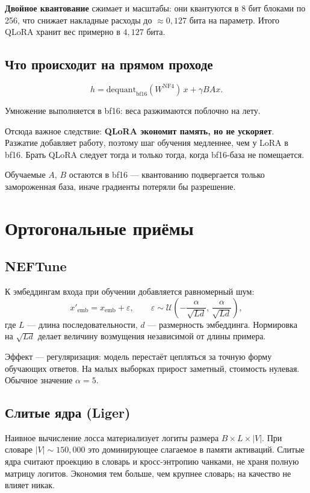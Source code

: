 \documentclass[11pt,a4paper]{article}
\begin{document}
\textbf{Двойное квантование} сжимает и масштабы: они квантуются в 8 бит
блоками по 256, что снижает накладные расходы до $\approx 0{,}127$ бита
на параметр. Итого QLoRA хранит вес примерно в $4{,}127$ бита.

\subsection{Что происходит на прямом проходе}

\[
h = \text{dequant}_{\text{bf16}}(W^{\text{NF4}})\,x + \gamma BAx .
\]

Умножение выполняется в bf16: веса разжимаются поблочно на лету.

\begin{keybox}
Отсюда важное следствие: \textbf{QLoRA экономит память, но не ускоряет}.
Разжатие добавляет работу, поэтому шаг обучения медленнее, чем у LoRA
в bf16. Брать QLoRA следует тогда и только тогда, когда bf16-база
не помещается.
\end{keybox}

Обучаемые $A$, $B$ остаются в bf16 — квантованию подвергается только
замороженная база, иначе градиенты потеряли бы разрешение.

\section{Ортогональные приёмы}

\subsection{NEFTune}

К эмбеддингам входа при обучении добавляется равномерный шум:
\[
x'_{\text{emb}} = x_{\text{emb}} + \varepsilon,
\qquad
\varepsilon \sim \mathcal{U}\!\left(-\frac{\alpha}{\sqrt{Ld}},\,
\frac{\alpha}{\sqrt{Ld}}\right),
\]
где $L$ — длина последовательности, $d$ — размерность эмбеддинга.
Нормировка на $\sqrt{Ld}$ делает величину возмущения независимой
от длины примера.

Эффект — регуляризация: модель перестаёт цепляться за точную форму
обучающих ответов. На малых выборках прирост заметный, стоимость
нулевая. Обычное значение $\alpha = 5$.

\subsection{Слитые ядра (Liger)}

Наивное вычисление лосса материализует логиты размера
$B \times L \times |V|$. При словаре $|V| \sim 150{,}000$ это доминирующее
слагаемое в памяти активаций. Слитые ядра считают проекцию в словарь
и кросс-энтропию чанками, не храня полную матрицу логитов. Экономия тем
больше, чем крупнее словарь; на качество не влияет никак.
\end{document}
